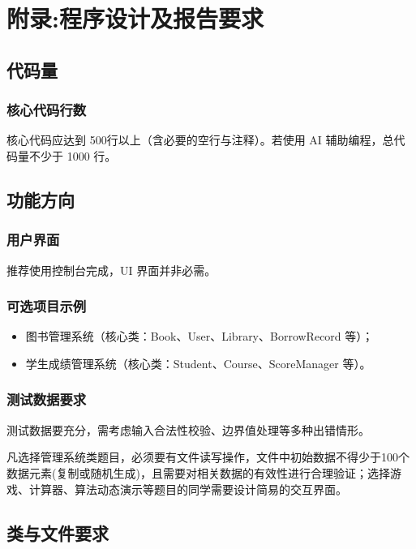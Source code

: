 


\section{附录:程序设计及报告要求} \label{app:task}

\subsection{代码量}
\subsubsection{核心代码行数}
核心代码应达到 500行以上（含必要的空行与注释）。若使用 AI 辅助编程，总代码量不少于 1000 行。

\subsection{功能方向}
\subsubsection{用户界面}
推荐使用控制台完成，UI 界面并非必需。

\subsubsection{可选项目示例}
\begin{itemize}
	\item 图书管理系统（核心类：Book、User、Library、BorrowRecord 等）；
	\item 学生成绩管理系统（核心类：Student、Course、ScoreManager 等）。
\end{itemize}

\subsubsection{测试数据要求}
测试数据要充分，需考虑输入合法性校验、边界值处理等多种出错情形。

凡选择管理系统类题目，必须要有文件读写操作，文件中初始数据不得少于100个数据元素(复制或随机生成)，且需要对相关数据的有效性进行合理验证；选择游戏、计算器、算法动态演示等题目的同学需要设计简易的交互界面。

\subsection{类与文件要求}

